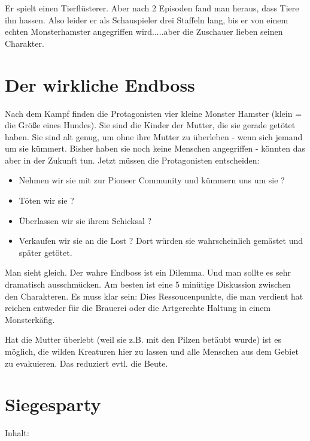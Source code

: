 \begin{npcBox}[title=Theophil Tierlieb]
    \begin{npcDescription}
    Er spielt einen Tierflüsterer. Aber nach 2 Episoden fand man heraus, dass Tiere ihn hassen. Also leider er als Schauspieler drei Staffeln lang, bis er von einem echten Monsterhamster angegriffen wird.....aber die Zuschauer lieben seinen Charakter.
    \end{npcDescription}

\end{npcBox}


\section{Der wirkliche Endboss}

Nach dem Kampf finden die Protagonisten vier kleine Monster Hamster (klein = die Größe eines Hundes). Sie sind die Kinder der Mutter, die sie gerade getötet haben. Sie sind alt genug, um ohne ihre Mutter zu überleben - wenn sich jemand um sie kümmert. Bisher haben sie noch keine Menschen angegriffen - könnten das aber in der Zukunft tun. Jetzt müssen die Protagonisten entscheiden:

\begin{itemize}
    \item Nehmen wir sie mit zur Pioneer Community und kümmern uns um sie ?
    \item Töten wir sie ?
    \item Überlassen wir sie ihrem Schicksal ?
    \item Verkaufen wir sie an die Lost ? Dort würden sie wahrscheinlich gemästet und später getötet.
\end{itemize}

Man sieht gleich. Der wahre Endboss ist ein Dilemma. Und man sollte es sehr dramatisch ausschmücken. Am besten ist eine 5 minütige Diskussion zwischen den Charakteren. Es muss klar sein: Dies Ressoucenpunkte, die man verdient hat reichen entweder für die Brauerei oder die Artgerechte Haltung in einem Monsterkäfig.

Hat die Mutter überlebt (weil sie z.B. mit den Pilzen betäubt wurde) ist es möglich, die wilden Kreaturen hier zu lassen und alle Menschen aus dem Gebiet zu evakuieren. Das reduziert evtl. die Beute.

\section{Siegesparty}

Inhalt:

